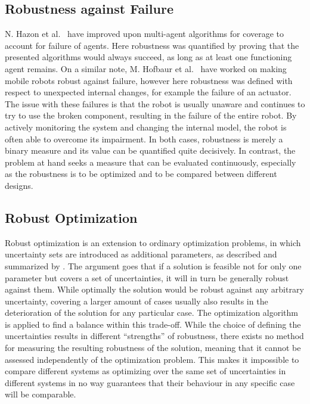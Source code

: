 \subsection{Robustness against Failure} \label{Robustness against Failure}
N. Hazon et al.\ \cite{covrob} have improved upon multi-agent algorithms for coverage  to account for failure of agents. Here robustness was quantified by proving that the presented algorithms would always succeed, as long as at least one functioning agent remains. On a similar note, M. Hofbaur et al.\ \cite{sysrob} have worked on making mobile robots robust against failure, however here robustness was defined with respect to unexpected internal changes, for example the failure of an actuator. The issue with these failures is that the robot is usually unaware and continues to try to use the broken component, resulting in the failure of the entire robot. By actively monitoring the system and changing the internal model, the robot is often able to overcome its impairment. In both cases, robustness is merely a binary measure and its value can be quantified quite decisively. In contrast, the problem at hand seeks a measure that can be evaluated continuously, especially as the robustness is to be optimized and to be compared between different designs. 
 

\subsection{Robust Optimization} \label{Robust Optimization}
Robust optimization is an extension to ordinary optimization problems, in which uncertainty sets are introduced as additional parameters, as described and summarized by \cite{optrob}. The argument goes that if a solution is feasible not for only one parameter but covers a set of uncertainties, it will in turn be generally robust against them. While optimally the solution would be robust against any arbitrary uncertainty, covering a larger amount of cases usually also results in the deterioration of the solution for any particular case. The optimization algorithm is applied to find a balance within this trade-off. While the choice of defining the uncertainties results in different “strengths” of robustness,  there exists no method for measuring the resulting robustness of the solution, meaning that it cannot be assessed independently of the optimization problem. This makes it impossible to compare different systems as optimizing over the same set of uncertainties in different systems in no way guarantees that their behaviour in any specific case will be comparable.


